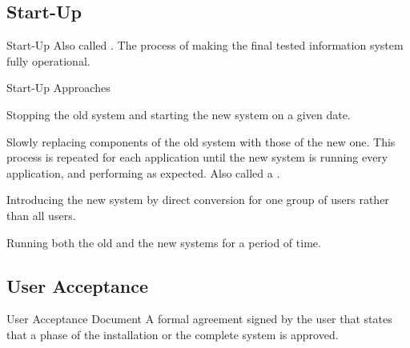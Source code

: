 \documentclass[\main/notes.tex]{subfiles}
\begin{document}
				\subsection{Start-Up}
					\begin{definition}{Start-Up}
						Also called . The process of making the final tested information system fully operational.
					\end{definition}
					\begin{sidenote}{Start-Up Approaches}
						\begin{description}[nosep]
							\item[Direct Conversion] Stopping the old system and starting the new system on a given date.
							\item[Phase-in Approach] Slowly replacing components of the old system with those of the new one. This process is repeated for each application until the new system is running every application, and performing as expected. Also called a \concept{piecemeal approach}.
							\item[Pilot Running] Introducing the new system by direct conversion for one group of users rather than all users.
							\item[Parallel Running] Running both the old and the new systems for a period of time.
						\end{description}
					\end{sidenote}
				\subsection{User Acceptance}
					\begin{definition}{User Acceptance Document}
						A formal agreement signed by the user that states that a phase of the installation or the complete system is approved.
					\end{definition}
\end{document}

